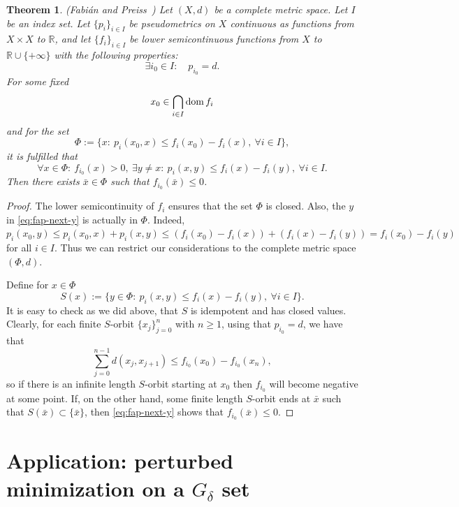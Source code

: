 \documentclass[12pt]{article}
\newtheorem{theorem}{Theorem}[section]
\def\dom{\mathop{\rm dom}}
\newcommand{\R}{\mathbb{R}}
\begin{document}
    \begin{theorem}(Fabi\'an and Preiss~\cite{Fabian_Preiss})
        \label{thm:fap}
        Let $(X,d)$ be a complete metric space. Let $I$ be an index set. Let $\{p_i\}_{i\in I}$ be pseudometrics on $X$ continuous as functions from  $X\times X$ to $\R$, and let $\{f_i\}_{i\in I}$ be lower semicontinuous functions from $X$ to $\mathbb{R}\cup\{+\infty\}$ with the following properties:
        \begin{equation}
            \label{eq:fap-i0}
            \exists i_0\in I:\quad p_{i_0} = d.
        \end{equation}
        For some fixed 
        $$
            x_0\in \bigcap_{i\in I} \dom f_i
        $$
        and for the set
        $$
            \Phi := \{x:\ p_i(x_0,x) \le f_i(x_0) - f_i(x),\ \forall i\in I\},
        $$
        it is fulfilled that
        \begin{equation}
            \label{eq:fap-next-y}
            \forall x\in \Phi:\ f_{i_0}(x) > 0,\ \exists y\neq x:\ p_i(x,y) \le f_i(x) - f_i(y),\ \forall i\in I.
        \end{equation}
        Then there exists $
              \bar x \in \Phi$ such that $f_{i_0}(\bar x) \le 0$.
    \end{theorem}
    \begin{proof}
        The lower semicontinuity of $f_i$ ensures that the set $\Phi$ is closed. Also, the $y$ in \eqref{eq:fap-next-y} is actually in $\Phi$. Indeed, $p_i(x_0,y) \le p_i(x_0,x) + p_i(x,y) \le (f_i(x_0)-f_i(x)) + (f_i(x)-f_i(y)) = f_i(x_0) - f_i(y)$ for all $i\in I$. Thus we can  restrict our considerations to the complete metric space $(\Phi,d)$.

        Define for $x\in \Phi$
        $$
            S(x) := \{y\in\Phi:\ p_i(x,y) \le f_i(x) - f_i(y),\ \forall i\in I\}.
        $$
        It is easy to check as we did above, that $S$ is idempotent and has closed values. Clearly, for each finite $S$-orbit $\{x_j\}_{j=0}^n$ with $n\ge1$, using that $p_{i_0}=d$, we have that
        $$
            \sum_{j=0}^{n-1} d(x_{j},x_{j+1}) \le f_{i_0}(x_0) - f_{i_0}(x_n),
        $$
        so if there is an infinite length $S$-orbit starting at $x_0$ then $f_{i_0}$ will become negative at some point. If, on the other hand, some finite length $S$-orbit ends at $\bar x$ such that $S(\bar x)\subset \{\bar x\}$, then \eqref{eq:fap-next-y} shows that $f_{i_0}(\bar x) \le 0$.
    \end{proof}

\section{Application: perturbed minimization on a $G_\delta$ set}\label{sec:gd}
\end{document}
